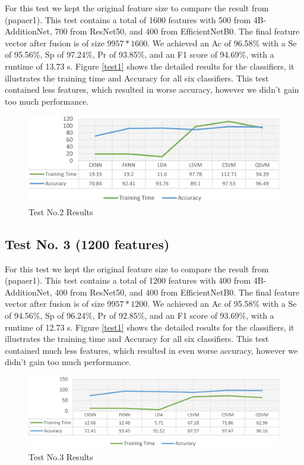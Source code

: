 \documentclass[conference]{IEEEtran}
\begin{document}
For this test we kept the original feature size to compare the result from (papaer1).
This test contains a total of 1600 features with 500 from 4B-AdditionNet, 700 from ResNet50, and 400 from EfficientNetB0. 
The final feature vector after fusion is of size $9957*1600$.
We achieved an Ac of 96.58\% with a Se of 95.56\%, Sp of 97.24\%, Pr of 93.85\%, and an F1 score of 94.69\%, with a runtime of 13.73 s. 
Figure \ref{test1} shows the detailed results for the classifiers, it illustrates the training time and Accuracy for all six classifiers.
This test contained less features, which resulted in worse accuracy, however we didn't gain too much performance.

\begin{figure}[htbp]
    \begin{center}
    \includegraphics[scale=0.25]{test2.png}
    \end{center}
    \caption{Test No.2 Results}
    \label{test2}
\end{figure}

\subsection{Test No. 3 (1200 features)}

For this test we kept the original feature size to compare the result from (papaer1).
This test contains a total of 1200 features with 400 from 4B-AdditionNet, 400 from ResNet50, and 400 from EfficientNetB0. 
The final feature vector after fusion is of size $9957*1200$.
We achieved an Ac of 95.58\% with a Se of 94.56\%, Sp of 96.24\%, Pr of 92.85\%, and an F1 score of 93.69\%, with a runtime of 12.73 s. 
Figure \ref{test1} shows the detailed results for the classifiers, it illustrates the training time and Accuracy for all six classifiers.
This test contained much less features, which resulted in even worse accuracy, however we didn't gain too much performance.

\begin{figure}[htbp]
    \begin{center}
    \includegraphics[scale=0.25]{test3.png}
    \end{center}
    \caption{Test No.3 Results}
    \label{test3}
\end{figure}
\end{document}
